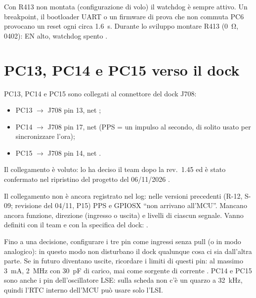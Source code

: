 \begin{attenzione}
Con R413 non montata (configurazione di volo) il watchdog è sempre attivo. Un breakpoint, il bootloader UART o un firmware di prova che non commuta PC6 provocano un reset ogni circa \SI{1.6}{\second}. Durante lo sviluppo montare R413 (\SI{0}{\ohm}, 0402): EN alto, watchdog spento .
\end{attenzione}

\section{PC13, PC14 e PC15 verso il dock}
\label{sec:pc13}
PC13, PC14 e PC15 sono collegati al connettore del dock J708:
\begin{itemize}
\item PC13 $\to$ J708 pin 13, net ;
\item PC14 $\to$ J708 pin 17, net  (PPS = un impulso al secondo, di solito usato per sincronizzare l'ora);
\item PC15 $\to$ J708 pin 14, net .
\end{itemize}
Il collegamento è voluto: lo ha deciso il team dopo la rev.\ 1.45 ed è stato confermato nel ripristino del progetto del 06/11/2026 .

\begin{verifica}
Il collegamento non è ancora registrato nel log: nelle versioni precedenti (R-12, S-09; revisione del 04/11, P15) PPS e GPIOSX \enquote{non arrivano all'MCU}. Mancano ancora funzione, direzione (ingresso o uscita) e livelli di ciascun segnale. Vanno definiti con il team e con la specifica del dock: \DV.
\end{verifica}
Fino a una decisione, configurare i tre pin come ingressi senza pull (o in modo analogico): in questo modo non disturbano il dock qualunque cosa ci sia dall'altra parte. Se in futuro diventano uscite, ricordare i limiti di questi pin: al massimo \SI{3}{\milli\ampere}, \SI{2}{\mega\hertz} con \SI{30}{\pico\farad} di carico, mai come sorgente di corrente . PC14 e PC15 sono anche i pin dell'oscillatore LSE: sulla scheda non c'è un quarzo a \SI{32}{\kilo\hertz}, quindi l'RTC interno dell'MCU può usare solo l'LSI.
